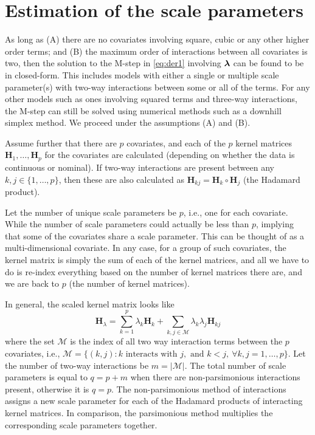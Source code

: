 \documentclass[english, 11pt]{article}
\begin{document}
\section{Estimation of the scale parameters}
\label{sec:estscale}

As long as (A) there are no covariates involving square, cubic or any other higher order terms; and (B) the maximum order of interactions between all covariates is two, then the solution to the M-step in \eqref{eq:der1} involving $\boldsymbol\lambda$ can be found to be in closed-form. This includes models with either a single or multiple scale parameter(s) with two-way interactions between some or all of the terms. For any other models such as ones involving squared terms and three-way interactions, the M-step can still be solved using numerical methods such as a downhill simplex method. We proceed under the assumptions (A) and (B).

Assume further that there are $p$ covariates, and each of the $p$ kernel matrices $\mathbf H_1, \dots, \mathbf H_p$ for the covariates are calculated (depending on whether the data is continuous or nominal). If two-way interactions are present between any $k,j \in \{1,\dots,p\}$, then these are also calculated as $\mathbf H_{kj} = \mathbf H_k \circ \mathbf H_j$ (the Hadamard product).

Let the number of unique scale parameters be $p$, i.e., one for each covariate. While the number of scale parameters could actually be less than $p$, implying that some of the covariates share a scale parameter. This can be thought of as a multi-dimensional covariate. In any case, for a group of such covariates, the kernel matrix is simply the sum of each of the kernel matrices, and all we have to do is re-index everything based on the number of kernel matrices there are, and we are back to $p$ (the number of kernel matrices).

In general, the scaled kernel matrix looks like
\[
	\mathbf H_{\lambda} = \sum_{k=1}^p \lambda_k \mathbf H_k + \sum_{k,j\in \mathcal M} \lambda_k\lambda_j \mathbf H_{kj}
\]
where the set $\mathcal M$ is the index of all two way interaction terms between the $p$ covariates, i.e., $\mathcal M=\{(k,j): k \text{ interacts with } j, \text{ and } k < j, \ \forall k,j=1,\dots,p \}$. Let the number of two-way interactions be $m=|\mathcal M|$. The total number of scale parameters is equal to $q=p+m$ when there are non-parsimonious interactions present, otherwise it is $q=p$. The non-parsimonious method of interactions assigns a new scale parameter for each of the Hadamard products of interacting kernel matrices\footnotemark. In comparison, the parsimonious method multiplies the corresponding scale parameters together. 
\end{document}
